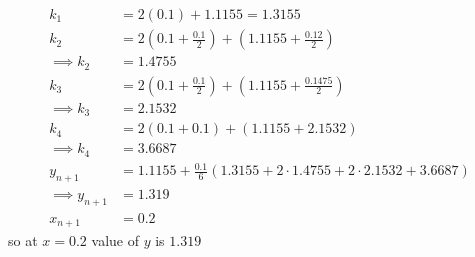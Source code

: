\documentclass[journal,12pt,twocolumn]{IEEEtran}
\theoremstyle{remark}
\begin{document}
\begin{align}
    k_1&=2(0.1)+1.1155=1.3155\\
    k_2&=2(0.1+\frac{0.1}{2})+(1.1155+\frac{0.12}{2})\\
    \implies k_2&= 1.4755\\
    k_3&=2(0.1+\frac{0.1}{2})+(1.1155+\frac{0.1475}{2})\\
    \implies k_3&=2.1532\\
    k_4&=2(0.1+0.1)+(1.1155+2.1532)\\
    \implies k_4&=3.6687\\
     y_{n+1}&=1.1155+\frac{0.1}{6}(1.3155+2\cdot1.4755+2\cdot2.1532+3.6687)\\
     \implies y_{n+1}&=1.319\\
     x_{n+1}&=0.2
\end{align}
so at $x=0.2$ value of $y$ is $1.319$
\end{document}
